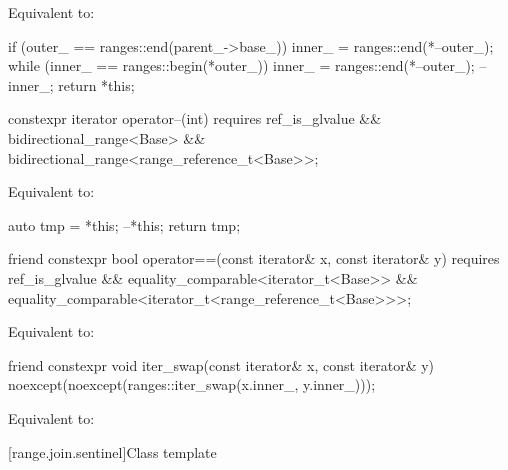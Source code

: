 \begin{itemdescr}
\pnum
\effects
Equivalent to:
\begin{codeblock}
if (outer_ == ranges::end(parent_->base_))
  inner_ = ranges::end(*--outer_);
while (inner_ == ranges::begin(*outer_))
  inner_ = ranges::end(*--outer_);
--inner_;
return *this;
\end{codeblock}
\end{itemdescr}

%
\begin{itemdecl}
constexpr iterator operator--(int)
  requires ref_is_glvalue && bidirectional_range<Base> &&
           bidirectional_range<range_reference_t<Base>>;
\end{itemdecl}

\begin{itemdescr}
\pnum
\effects
Equivalent to:
\begin{codeblock}
auto tmp = *this;
--*this;
return tmp;
\end{codeblock}
\end{itemdescr}

%
\begin{itemdecl}
friend constexpr bool operator==(const iterator& x, const iterator& y)
  requires ref_is_glvalue && equality_comparable<iterator_t<Base>> &&
           equality_comparable<iterator_t<range_reference_t<Base>>>;
\end{itemdecl}

\begin{itemdescr}
\pnum
\effects
Equivalent to:
\end{itemdescr}

%
\begin{itemdecl}
friend constexpr void iter_swap(const iterator& x, const iterator& y)
  noexcept(noexcept(ranges::iter_swap(x.inner_, y.inner_)));
\end{itemdecl}

\begin{itemdescr}
\pnum
\effects
Equivalent to: 
\end{itemdescr}

[range.join.sentinel]{Class template }

